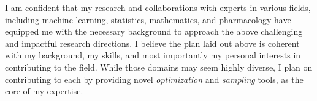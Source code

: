 \documentclass[twoside,11pt]{article}
\begin{document}
\clearpage

\vspace{0.2in}
\textbf{} 
\vspace{0.2in}

I am confident that my research and collaborations with experts in various fields, including machine learning, statistics, mathematics, and pharmacology have equipped me with the necessary background to approach the above challenging and impactful research directions.
I believe the plan laid out above is coherent with my background, my skills, and most importantly my personal interests in contributing to the field.
While those domains may seem highly diverse, I plan on contributing to each by providing novel \emph{optimization} and \emph{sampling} tools, as the core of my expertise.





\newpage
\textbf{}
\vspace{-0.3in}


\end{document}
